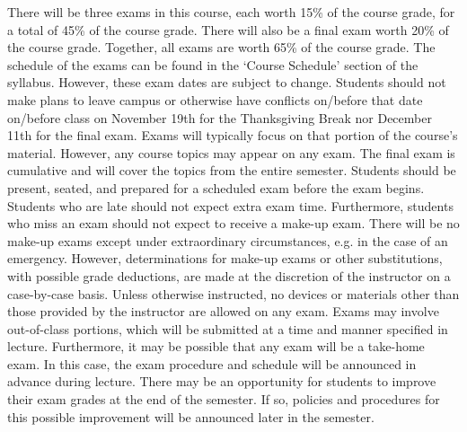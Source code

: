\documentclass[11pt,letterpaper]{article}
\begin{document}

There will be three exams in this course, each worth 15\% of the course grade, for a total of 45\% of the course grade. There will also be a final exam worth 20\% of the course grade. Together, all exams are worth 65\% of the course grade. The schedule of the exams can be found in the `Course Schedule' section of the syllabus. However, these exam dates are subject to change. Students should not make plans to leave campus or otherwise have conflicts on/before that date on/before class on November 19th for the Thanksgiving Break nor December 11th for the final exam. Exams will typically focus on that portion of the course's material. However, any course topics may appear on any exam. The final exam is cumulative and will cover the topics from the entire semester. Students should be present, seated, and prepared for a scheduled exam before the exam begins. Students who are late should not expect extra exam time. Furthermore, students who miss an exam should not expect to receive a make-up exam. There will be no make-up exams except under extraordinary circumstances, e.g. in the case of an emergency. However, determinations for make-up exams or other substitutions, with possible grade deductions, are made at the discretion of the instructor on a case-by-case basis. Unless otherwise instructed, no devices or materials other than those provided by the instructor are allowed on any exam. Exams may involve out-of-class portions, which will be submitted at a time and manner specified in lecture. Furthermore, it may be possible that any exam will be a take-home exam. In this case, the exam procedure and schedule will be announced in advance during lecture. There may be an opportunity for students to improve their exam grades at the end of the semester. If so, policies and procedures for this possible improvement will be announced later in the semester. 
\sectionbreak



\end{document}
